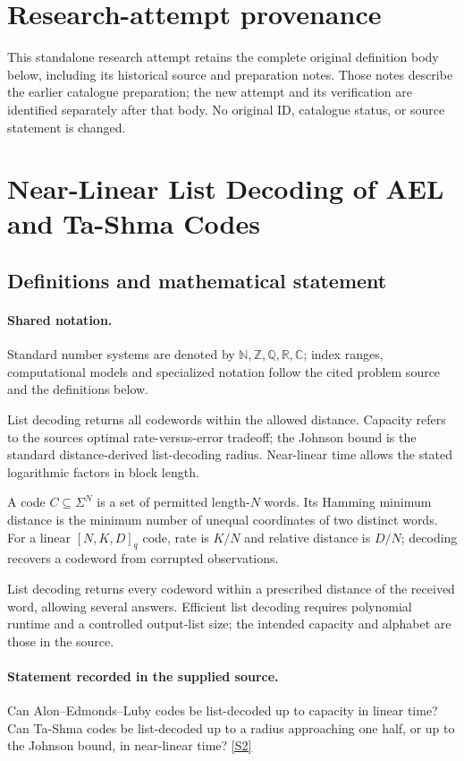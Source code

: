 \documentclass[11pt]{article}
\begin{document}
\section*{Research-attempt provenance}
This standalone research attempt retains the complete original definition body below,
including its historical source and preparation notes. Those notes describe the
earlier catalogue preparation; the new attempt and its verification are identified
separately after that body. No original ID, catalogue status, or source statement is changed.

\section{Near-Linear List Decoding of AEL and Ta-Shma Codes}\label{statement}

\subsection{Definitions and mathematical statement}

\paragraph{Shared notation.}Standard number systems are denoted by $\mathbb N,\mathbb Z,\mathbb Q,\mathbb R,\mathbb C$; index ranges, computational models and specialized notation follow the cited problem source and the definitions below.


List decoding returns all codewords within the allowed distance. Capacity refers to the source\textquotesingle s optimal rate-versus-error tradeoff; the Johnson bound is the standard distance-derived list-decoding radius. Near-linear time allows the stated logarithmic factors in block length.

A code $C\subseteq\Sigma^N$ is a set of permitted length-$N$ words. Its Hamming minimum distance is the minimum number of unequal coordinates of two distinct words. For a linear $[N,K,D]_q$ code, rate is $K/N$ and relative distance is $D/N$; decoding recovers a codeword from corrupted observations.

List decoding returns every codeword within a prescribed distance of the received word, allowing several answers. Efficient list decoding requires polynomial runtime and a controlled output-list size; the intended capacity and alphabet are those in the source.
\paragraph{Statement recorded in the supplied source.}
Can Alon–Edmonds–Luby codes be list-decoded up to capacity in linear time? Can Ta-Shma codes be list-decoded up to a radius approaching one half, or up to the Johnson bound, in near-linear time? \href{https://doi.org/10.4171/owr/2025/41}{[S2]}
\end{document}
